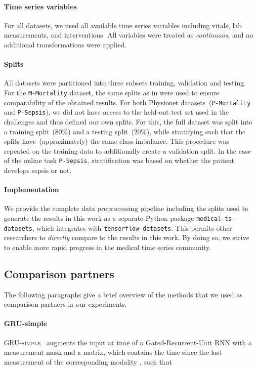 \documentclass{article}
\newcommand{\dataset}[1]{\texttt{#1}}
\newcommand{\method}[1]{\textsc{#1}}
\begin{document}
\paragraph{Time series variables}

For all datasets, we used all available time series variables including vitals,
lab measurements, and interventions. All variables were treated as
\emph{continuous}, and no additional transformations were applied.

\paragraph{Splits}

All datasets were partitioned into three subsets training, validation and
testing. For the \dataset{M-Mortality} dataset, the same splits as in
\cite{Harutyunyan2019} were used to ensure comparability of the obtained
results.  For both Physionet datasets~(\dataset{P-Mortality} and
\dataset{P-Sepsis}), we did not have access to the held-out test set used in
the challenges and thus defined our own splits. For this, the full dataset was
split into a training split~(80\%) and a testing split~(20\%), while
stratifying such that the splits have~(approximately) the same class imbalance.
This procedure was repeated on the training data to additionally create
a validation split. In the case of the online task \dataset{P-Sepsis},
stratification was based on whether the patient develops sepsis or not.

\paragraph{Implementation} We provide the complete data preprocessing
pipeline including the splits used to generate the results in this work
as a separate Python package \texttt{medical-ts-datasets}, which
integrates with \texttt{tensorflow-datasets}\citep{TFDS}.  This permits other
researchers to \emph{directly} compare to the results in this work. By
doing so, we strive to enable more rapid progress in the medical time
series community.

\subsection{Comparison partners}

The following paragraphs give a brief overview of the methods that we
used as comparison partners in our experiments.

\paragraph{GRU-simple}
\method{GRU-simple}~\citep{che2018recurrent} augments the input at time
 of a Gated-Recurrent-Unit RNN with a measurement mask  and a 
matrix, which contains the time since the last measurement of the corresponding
modality , such that
\end{document}
